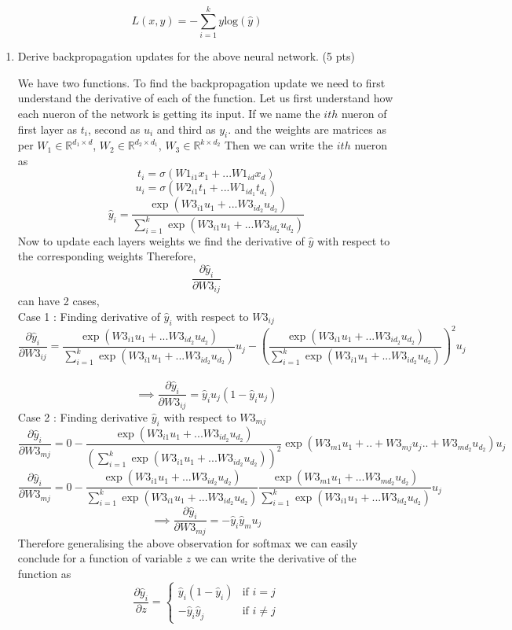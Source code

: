 \documentclass[a4paper]{article}
\theoremstyle{definition}
\newenvironment{soln}{
    \leavevmode\color{blue}\ignorespaces
}{}
\begin{document}
\[
L(x, y) = -\sum_{i=1}^k y \text{log}(\hat{y})
\]

\begin{enumerate}
    \item Derive backpropagation updates for the above neural network. (5 pts)
    \begin{soln}
    We have two functions. To find the backpropagation update we need to first understand the derivative of each of the function. 
    Let us first understand how each nueron of the network is getting its input. If we name the $ith$ nueron of first layer as $t_i$, second as $u_i$ and third as $y_i$. and the weights are matrices as per $W_1 \in \mathbb{R}^{d_1 \times d}$, $W_2 \in \mathbb{R}^{d_2 \times d_1}$, $W_3 \in \mathbb{R}^{k \times d_2}$  Then we can write the $ith$ nueron as 
    $$
    t_i=\sigma(W1_{i1}x_1+...W1_{id}x_d)
    $$
    $$
    u_i=\sigma(W2_{i1}t_1+...W1_{id_1}t_{d_1})
    $$
    $$
    \hat y_i=\frac{\exp(W3_{i1}u_1+...W3_{id_2}u_{d_2})}{\sum_{i=1}^k \exp(W3_{i1}u_1+...W3_{id_2}u_{d_2})}
    $$
    Now to update each layers weights we find the derivative of $\hat y$ with respect to the corresponding weights
    Therefore,
    $$
    \frac{\partial{\hat y_i}}{\partial{W3_{ij}}}
    $$
    can have 2 cases, \\
    Case 1 : Finding derivative of $\hat y_i$ with respect to
    $
    W3_{ij}
    $
    $$
    \frac{\partial{\hat y_i}}{\partial{W3_{ij}}}=\frac{\exp(W3_{i1}u_1+...W3_{id_2}u_{d_2})}{\sum_{i=1}^k \exp(W3_{i1}u_1+...W3_{id_2}u_{d_2})}u_j-(\frac{\exp(W3_{i1}u_1+...W3_{id_2}u_{d_2})}{\sum_{i=1}^k \exp(W3_{i1}u_1+...W3_{id_2}u_{d_2})})^2u_j
    $$
    \\
    $$
    \implies \frac{\partial{\hat y_i}}{\partial{W3_{ij}}}=\hat y_iu_j(1-\hat y_iu_j)
    $$
    Case 2 : Finding derivative $\hat y_i$ with respect to $W3_{mj}$
    $$
    \frac{\partial{\hat y_i}}{\partial{W3_{mj}}}=0-\frac{\exp(W3_{i1}u_1+...W3_{id_2}u_{d_2})}{(\sum_{i=1}^k \exp(W3_{i1}u_1+...W3_{id_2}u_{d_2}))^2}\exp(W3_{m1}u_1+..+W3_{mj}u_j..+W3_{md_2}u_{d_2})u_j
    $$
    $$
    \frac{\partial{\hat y_i}}{\partial{W3_{mj}}}=0-\frac{\exp(W3_{i1}u_1+...W3_{id_2}u_{d_2})}{\sum_{i=1}^k \exp(W3_{i1}u_1+...W3_{id_2}u_{d_2})}\frac{\exp(W3_{m1}u_1+...W3_{md_2}u_{d_2})}{\sum_{i=1}^k \exp(W3_{i1}u_1+...W3_{id_2}u_{d_2})}u_j
    $$
    $$
    \implies \frac{\partial{\hat y_i}}{\partial{W3_{mj}}}=-\hat y_i\hat y_mu_j
    $$
    Therefore generalising the above observation for softmax we can easily conclude for a function of variable $z$ we can write the derivative of the function as 
    \begin{equation}
\frac{\partial{\hat y_i}}{\partial{z}}=
    \begin{cases}
        \hat y_i(1-\hat y_i) & \text{if } i=j\\
        -\hat y_i \hat y_j & \text{if } i\neq j
    \end{cases}
\end{equation}



\end{soln}
\end{enumerate}
\end{document}
